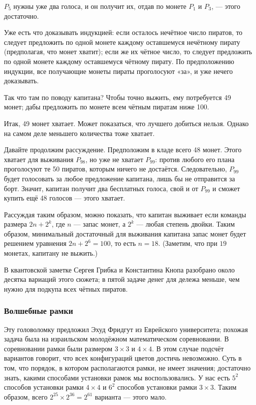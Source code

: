 $P_5$ нужны уже два голоса, и он получит их, отдав по монете $P_1$ и $P_3$, --- этого достаточно.

Уже есть что доказывать индукцией:
если осталось нечётное число пиратов, то следует предложить по одной монете каждому оставшемуся нечётному пирату (предполагая, что монет хватит);
если же их чётное число, то следует предложить по одной монете каждому оставшемуся чётному пирату.
По предположению индукции, все получающие монеты пираты проголосуют «за», и уже нечего доказывать.

Так что там по поводу капитана?
Чтобы точно выжить, ему потребуется 49 монет; дабы предложить по монете всем чётным пиратам ниже 100.

\begin{addedbytheeditors}
Итак, 49 монет хватает.
Может показаться, что лучшего добиться нельзя.
Однако на самом деле меньшего количества тоже хватает.

Давайте продолжим рассуждение.
Предположим в кладе всего 48 монет.
Этого хватает для выживания $P_{98}$, но уже не хватает $P_{99}$: против любого его плана проголосуют те 50 пиратов, которым ничего не достаётся.
Следовательно, $P_{99}$ будет голосовать за любое предложение капитана, лишь бы не отправится за борт.
Значит, капитан получит два бесплатных голоса, свой и от $P_{99}$ и сможет купить ещё 48 голосов --- этого хватает.   

Рассуждая таким образом, можно показать, что капитан выживает если команды размера $2n+2^k$, где $n$ --- запас монет, а $2^k$ --- любая степень двойки.
Таким образом, минимальный достаточный для выживания капитана запас монет будет решением уравнения $2n+2^6=100$, то есть $n=18$.
(Заметим, что при $19$ монетах, капитану не выжить.) 

В квантовской заметке  Сергея Грибка и Константина Кнопа \cite{gribok-knop} разобрано около десятка вариаций этого сюжета;
в пятой задаче денег для дележа меньше, чем нужно для подкупа всех чётных пиратов.
\pr
\end{addedbytheeditors}


\subsubsection*{Волшебные рамки}

Эту головоломку предложил Эхуд Фридгут из Еврейского университета; похожая задача была на израильском молодёжном математическом соревновании.
В соревновании рамки были размером $3 \times 3$ и $4 \times 4$.
В этом случае подсчёт вариантов говорит, что всех конфигураций цветов достичь невозможно.
Суть в том, что порядок, в котором располагаются рамки, не имеет значения;
достаточно знать, какими способами установки рамок мы воспользовались.
У нас есть $5^2$ способов установки рамки $4 \times 4$
и $6^2$ способов установки рамки $3 \times 3$.
Таким образом, всего $2^{25} \times 2^{36} = 2^{61}$ варианта — этого мало.

